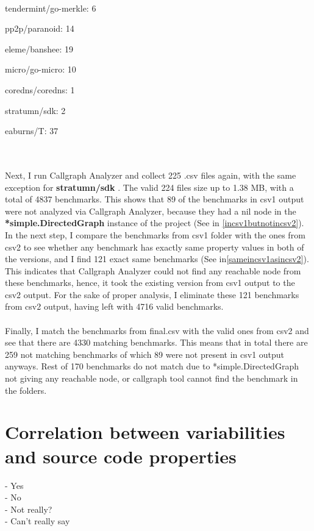\documentclass{seal_thesis}
\begin{document}
\noindent\begin{itemize*}[font={\color{red!50!black}}]\\
	\item tendermint/go-merkle: 6
	\item pp2p/paranoid: 14
	\item eleme/banshee: 19
	\item micro/go-micro: 10
	\item coredns/coredns: 1
	\item stratumn/sdk: 2
	\item eaburns/T: 37 
\end{itemize*}
\\\\
Next, I run Callgraph Analyzer and collect 225 .csv files again, with the same exception for \textbf{stratumn/sdk} \cite{stratumn/sdk}. The valid 224 files size up to 1.38 MB, with a total of 4837 benchmarks. This shows that 89 of the benchmarks in csv1 output were not analyzed via Callgraph Analyzer, because they had a nil node in the \textbf{*simple.DirectedGraph} instance of the project (See in \ref{incsv1butnotincsv2}). In the next step, I compare the benchmarks from csv1 folder with the ones from csv2 to see whether any benchmark has exactly same property values in both of the versions, and I find 121 exact same benchmarks (See in\ref{sameincsv1asincsv2}). This indicates that Callgraph Analyzer could not find any reachable node from these benchmarks, hence, it took the existing version from csv1 output to the csv2 output. For the sake of proper analysis, I eliminate these 121 benchmarks from csv2 output, having left with 4716 valid benchmarks.\\
\\
Finally, I match the benchmarks from final.csv with the valid ones from csv2 and see that there are 4330 matching benchmarks. This means that in total there are 259 not matching benchmarks of which 89 were not present in csv1 output anyways. Rest of 170 benchmarks do not match due to *simple.DirectedGraph not giving any reachable node, or callgraph tool cannot find the benchmark in the folders. 


\section{Correlation between variabilities and source code properties}
- Yes \\
- No \\
- Not really? \\
- Can't really say \\
\end{document}
